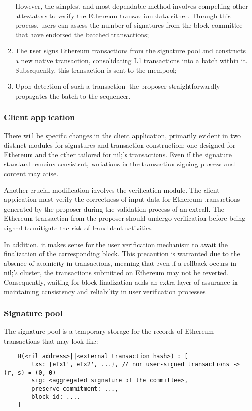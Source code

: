 \begin{enumerate}
    However, the simplest and most dependable method involves compelling other 
    attestators to verify the Ethereum transaction data either. Through this process, users can 
    assess the number of signatures from the block committee that have endorsed 
    the batched transactions;
    \item The user signs Ethereum transactions from the signature pool and constructs a new 
    native transaction, consolidating L1 transactions into a batch within it. 
    Subsequently, this transaction is sent to the mempool;
    \item Upon detection of such a transaction, the proposer straightforwardly propagates the 
    batch to the sequencer.
\end{enumerate}

\subsubsection{Client application}

There will be specific changes in the client application, primarily evident in two distinct 
modules for signatures and transaction construction: one designed for Ethereum and the other 
tailored for nil;'s transactions. Even if the signature standard remains consistent, variations 
in the transaction signing process and content may arise.

Another crucial modification involves the verification module. The client application must 
verify the correctness of input data for Ethereum transactions generated by the proposer during 
the validation process of an extcall. The Ethereum transaction from the proposer should undergo 
verification before being signed to mitigate the risk of fraudulent activities. 

In addition, it makes sense for the user verification mechanism to await the finalization of the 
corresponding block. This precaution is warranted due to the absence of atomicity in 
transactions, meaning that even if a rollback occurs in nil;'s cluster, the transactions 
submitted on Ethereum may not be reverted. Consequently, waiting for block finalization adds 
an extra layer of assurance in maintaining consistency and reliability in user verification 
processes.

\subsubsection{Signature pool}

The signature pool is a temporary storage for the records of Ethereum transactions that may 
look like:
\begin{verbatim}
    H(<nil address>||<external transaction hash>) : [
        txs: {eTx1', eTx2', ...}, // non user-signed transactions -> (r, s) = (0, 0)
        sig: <aggregated signature of the committee>,
        preserve_commitment: ...,
        block_id: ....
    ]
\end{verbatim}

